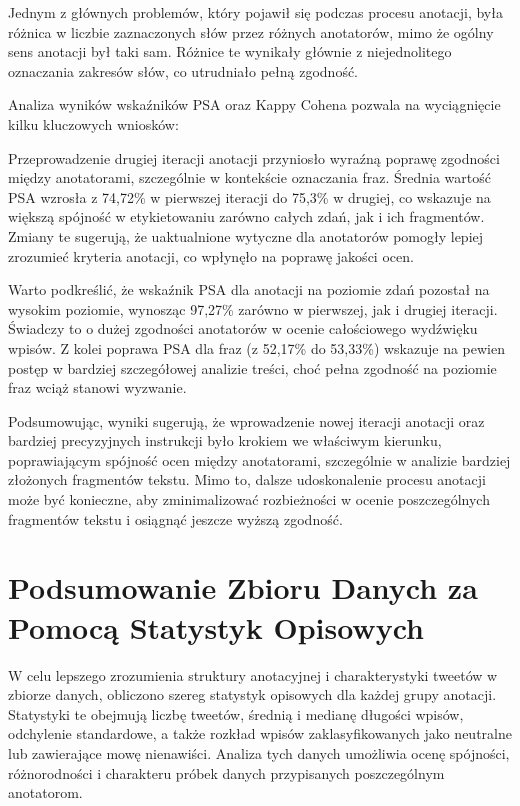 \documentclass[12pt]{article}
\begin{document}
Jednym z głównych problemów, który pojawił się podczas procesu anotacji, była różnica w liczbie zaznaczonych słów przez różnych anotatorów, mimo że ogólny sens anotacji był taki sam. Różnice te wynikały głównie z niejednolitego oznaczania zakresów słów, co utrudniało pełną zgodność.

Analiza wyników wskaźników PSA oraz Kappy Cohena pozwala na wyciągnięcie kilku kluczowych wniosków:

Przeprowadzenie drugiej iteracji anotacji przyniosło wyraźną poprawę zgodności między anotatorami, szczególnie w kontekście oznaczania fraz. Średnia wartość PSA wzrosła z 74,72\% w pierwszej iteracji do 75,3\% w drugiej, co wskazuje na większą spójność w etykietowaniu zarówno całych zdań, jak i ich fragmentów. Zmiany te sugerują, że uaktualnione wytyczne dla anotatorów pomogły lepiej zrozumieć kryteria anotacji, co wpłynęło na poprawę jakości ocen.

Warto podkreślić, że wskaźnik PSA dla anotacji na poziomie zdań pozostał na wysokim poziomie, wynosząc 97,27\% zarówno w pierwszej, jak i drugiej iteracji. Świadczy to o dużej zgodności anotatorów w ocenie całościowego wydźwięku wpisów. Z kolei poprawa PSA dla fraz (z 52,17\% do 53,33\%) wskazuje na pewien postęp w bardziej szczegółowej analizie treści, choć pełna zgodność na poziomie fraz wciąż stanowi wyzwanie.

Podsumowując, wyniki sugerują, że wprowadzenie nowej iteracji anotacji oraz bardziej precyzyjnych instrukcji było krokiem we właściwym kierunku, poprawiającym spójność ocen między anotatorami, szczególnie w analizie bardziej złożonych fragmentów tekstu. Mimo to, dalsze udoskonalenie procesu anotacji może być konieczne, aby zminimalizować rozbieżności w ocenie poszczególnych fragmentów tekstu i osiągnąć jeszcze wyższą zgodność.

\section{Podsumowanie Zbioru Danych za Pomocą Statystyk Opisowych}

W celu lepszego zrozumienia struktury anotacyjnej i charakterystyki tweetów w zbiorze danych, obliczono szereg statystyk opisowych dla każdej grupy anotacji. Statystyki te obejmują liczbę tweetów, średnią i medianę długości wpisów, odchylenie standardowe, a także rozkład wpisów zaklasyfikowanych jako neutralne lub zawierające mowę nienawiści. Analiza tych danych umożliwia ocenę spójności, różnorodności i charakteru próbek danych przypisanych poszczególnym anotatorom.
\end{document}
